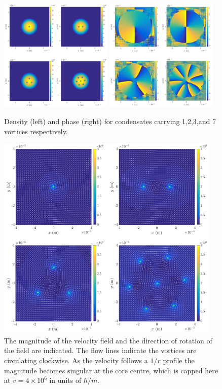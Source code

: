 \begin{figure}\centering
    \includegraphics[width=0.48\textwidth]{Images/ch4_vtx/fewvortex_rho.pdf}
    \includegraphics[width=0.48\textwidth]{Images/ch4_vtx/fewvortex_theta.pdf}
    \caption{Density (left) and phase (right) for condensates carrying 1,2,3,and 7 vortices respectively.}
    \label{fig:few_rho}
\end{figure}

\begin{figure}\centering
    \includegraphics[width=0.95\textwidth]{Images/ch4_vtx/velocity.pdf}
    \caption{The magnitude of the velocity field and the direction of rotation of the field are indicated. The flow lines indicate the vortices are circulating clockwise. As the velocity follows a $1/r$ profile the magnitude becomes singular at the core centre, which is capped here at $v=4\times 10^{6}$ in units of $\hbar/m$.}
    \label{fig:vel_field}
\end{figure}

